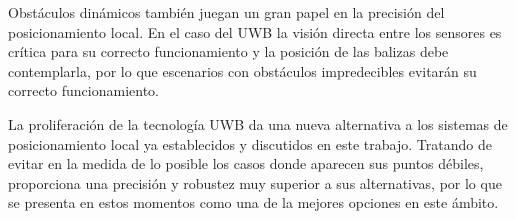 Obstáculos dinámicos también juegan un gran papel en la precisión del posicionamiento local.
En el caso del UWB la visión directa entre los sensores es crítica para su correcto funcionamiento y la posición de las balizas debe contemplarla, por lo que escenarios con obstáculos impredecibles evitarán su correcto funcionamiento.

La proliferación de la tecnología UWB da una nueva alternativa a los sistemas de posicionamiento local ya establecidos y discutidos en este trabajo.
Tratando de evitar en la medida de lo posible los casos donde aparecen sus puntos débiles, proporciona una precisión y robustez muy superior a sus alternativas, por lo que se presenta en estos momentos como una de la mejores opciones en este ámbito.